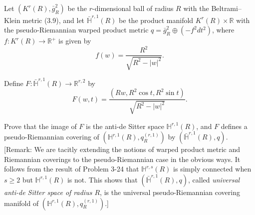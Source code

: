 \begin{exercise}
\label{prob:universal-anti-de-sitter}
Let $(K^r(R), \bar{g}_R^2)$ be the $r$-dimensional ball of radius $R$ with the Beltrami--Klein metric (3.9), and let $\bar{\mathbb{H}}^{r,1}(R)$ be the product manifold $K^r(R) \times \mathbb{R}$ with the pseudo-Riemannian warped product metric $q = \bar{g}_R^2 \oplus (-f^2 dt^2)$, where $f: K^r(R) \to \mathbb{R}^+$ is given by
\[
f(w) = \frac{R^2}{\sqrt{R^2 - |w|^2}}.
\]

Define $F: \bar{\mathbb{H}}^{r,1}(R) \to \mathbb{R}^{r,2}$ by
\[
F(w,t) = \frac{(Rw, R^2 \cos t, R^2 \sin t)}{\sqrt{R^2 - |w|^2}}.
\]

Prove that the image of $F$ is the anti-de Sitter space $\mathbb{H}^{r,1}(R)$, and $F$ defines a pseudo-Riemannian covering of $(\mathbb{H}^{r,1}(R), q_R^{(r,1)})$ by $(\bar{\mathbb{H}}^{r,1}(R), q)$. [Remark: We are tacitly extending the notions of warped product metric and Riemannian coverings to the pseudo-Riemannian case in the obvious ways. It follows from the result of Problem 3-24 that $\mathbb{H}^{r,s}(R)$ is simply connected when $s \geq 2$ but $\mathbb{H}^{r,1}(R)$ is not. This shows that $(\bar{\mathbb{H}}^{r,1}(R), q)$, called \textit{universal anti-de Sitter space of radius $R$}, is the universal pseudo-Riemannian covering manifold of $(\mathbb{H}^{r,1}(R), q_R^{(r,1)})$.]
\end{exercise}
